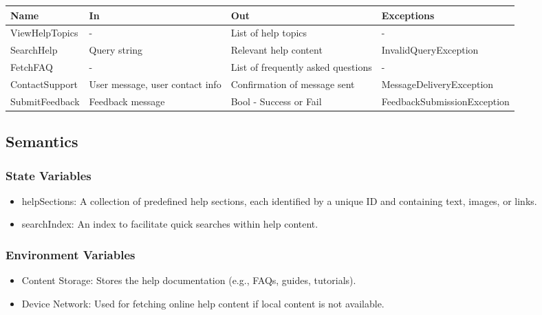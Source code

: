 \documentclass[12pt, titlepage]{article}
\begin{document}
\begin{center}
  \begin{tabular}{p{3cm} p{4cm} p{4cm} p{5cm}}
    \hline
    \textbf{Name}  & \textbf{In}                     & \textbf{Out}                       & \textbf{Exceptions}         \\
    \hline
    ViewHelpTopics & -                               & List of help topics                & -                           \\
    \hline
    SearchHelp     & Query string                    & Relevant help content              & InvalidQueryException       \\
    \hline
    FetchFAQ       & -                               & List of frequently asked questions & -                           \\
    \hline
    ContactSupport & User message, user contact info & Confirmation of message sent       & MessageDeliveryException    \\
    \hline
    SubmitFeedback & Feedback message                & Bool - Success or Fail             & FeedbackSubmissionException \\
    \hline
  \end{tabular}
\end{center}


\subsection{Semantics}

\subsubsection{State Variables}

\begin{itemize}
  \item helpSections: A collection of predefined help sections, each identified by a unique ID and containing text, images, or links.
  \item searchIndex: An index to facilitate quick searches within help content.
\end{itemize}

\subsubsection{Environment Variables}

\begin{itemize}
  \item Content Storage: Stores the help documentation (e.g., FAQs, guides, tutorials).
  \item Device Network: Used for fetching online help content if local content is not available.
\end{itemize}
\end{document}
